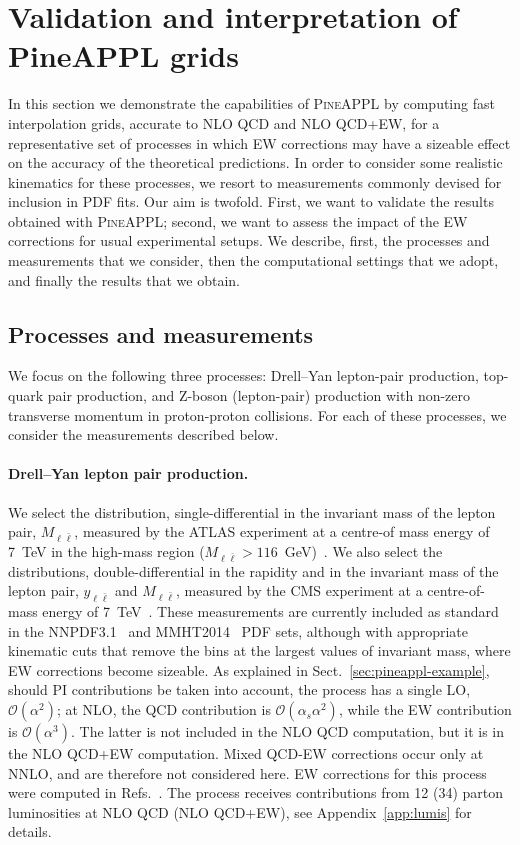 \section{Validation and interpretation of PineAPPL grids}
\label{sec:results}

In this section we demonstrate the capabilities of \textsc{PineAPPL} by
computing fast interpolation grids, accurate to NLO QCD and NLO QCD+EW,
for a representative set of processes in which EW corrections may have a
sizeable effect on the accuracy of the theoretical predictions.
In order to consider some realistic kinematics for these
processes, we resort to measurements commonly devised for inclusion in PDF
fits. Our aim is twofold. First, we want to validate the results
obtained with \textsc{PineAPPL}; second, we want to assess the
impact of the EW corrections for usual experimental setups. We describe, first,
the processes and measurements that we consider, then the computational
settings that we adopt, and finally the results that we obtain.

\subsection{Processes and measurements}
\label{subsec:processes_and_measurements}

We focus on the following three processes: Drell--Yan lepton-pair production,
top-quark pair production, and Z-boson (lepton-pair) production with non-zero
transverse momentum in proton-proton collisions. For each of these processes,
we consider the measurements described below.

\paragraph{Drell--Yan lepton pair production.}
We select the distribution, single-differential in the invariant mass of the
lepton pair, $M_{\ell \bar\ell}$, measured by the ATLAS experiment at a centre-of
mass energy of 7~TeV in the high-mass region
($M_{\ell\bar\ell}>116$~GeV)~\cite{Aad:2013iua}.
We also select the distributions, double-differential in the rapidity and in
the invariant mass of the lepton pair, $y_{\ell\bar\ell}$ and $M_{\ell\bar\ell}$,
measured by the CMS experiment at a centre-of-mass energy of
7~TeV~\cite{Chatrchyan:2013tia}.
These measurements are currently included as standard in the
NNPDF3.1~\cite{Ball:2017nwa} and MMHT2014~\cite{Harland-Lang:2014zoa} PDF sets,
although with appropriate kinematic cuts that remove the bins at the largest
values of invariant mass, where EW corrections become sizeable. As explained in
Sect.~\ref{sec:pineappl-example}, should PI contributions be taken into account,
the process has a single LO, $\mathcal{O}(\alpha^2)$; at NLO, the
QCD contribution is $\mathcal{O}(\alpha_s\alpha^2)$, while the EW contribution
is $\mathcal{O}(\alpha^3)$. The latter is not included in the NLO
QCD computation, but it is in the NLO QCD+EW computation. Mixed QCD-EW
corrections occur only at NNLO, and are therefore not considered here.
EW corrections for this process were computed in
Refs.~\cite{Baur:2001ze,Dittmaier:2009cr}. The process receives contributions
from 12 (34) parton luminosities at NLO QCD (NLO QCD+EW),
see Appendix~\ref{app:lumis} for details.


